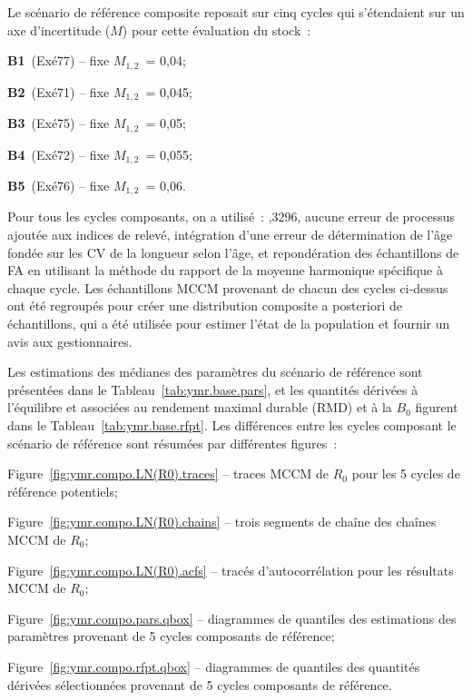 \documentclass[11pt]{book}
\begin{document}
Le sc\'{e}nario de r\'{e}f\'{e}rence composite reposait sur cinq cycles qui s'\'{e}tendaient sur un axe d'incertitude ($M$) pour cette \'{e}valuation du stock~:
\begin{itemize_csas}{}{}
\item \textbf{B1}~(Ex\'{e}77) -- fixe $M_{1,2}$~= 0,04;
\item \textbf{B2}~(Ex\'{e}71) -- fixe $M_{1,2}$~= 0,045;
\item \textbf{B3}~(Ex\'{e}75) -- fixe $M_{1,2}$~= 0,05;
\item \textbf{B4}~(Ex\'{e}72) -- fixe $M_{1,2}$~= 0,055;
\item \textbf{B5}~(Ex\'{e}76) -- fixe $M_{1,2}$~= 0,06.
\end{itemize_csas}

Pour tous les cycles composants, on a utilis\'{e}~: ,3296, aucune erreur de processus ajout\'{e}e aux indices de relev\'{e}, int\'{e}gration d'une erreur de d\'{e}termination de l'\^{a}ge fond\'{e}e sur les CV de la longueur selon l'\^{a}ge, et repond\'{e}ration des \'{e}chantillons de FA en utilisant la m\'{e}thode du rapport de la moyenne harmonique sp\'{e}cifique \`{a} chaque cycle.
Les \Nmcmc{} \'{e}chantillons MCCM provenant de chacun des cycles ci-dessus ont \'{e}t\'{e} regroup\'{e}s pour cr\'{e}er une distribution composite a posteriori de \Nbase{} \'{e}chantillons, qui a \'{e}t\'{e} utilis\'{e}e pour estimer l'\'{e}tat de la population et fournir un avis aux gestionnaires. 

Les estimations des m\'{e}dianes des param\`{e}tres du sc\'{e}nario de r\'{e}f\'{e}rence sont pr\'{e}sent\'{e}es dans le Tableau~\ref{tab:ymr.base.pars}, et les quantit\'{e}s d\'{e}riv\'{e}es \`{a} l'\'{e}quilibre et associ\'{e}es au rendement maximal durable (RMD) et \`{a} la $B_0$ figurent dans le Tableau~\ref{tab:ymr.base.rfpt}.
Les diff\'{e}rences entre les cycles composant le sc\'{e}nario de r\'{e}f\'{e}rence sont r\'{e}sum\'{e}es par diff\'{e}rentes figures~:
\begin{itemize_csas}{}{}
  \item Figure~\ref{fig:ymr.compo.LN(R0).traces} -- traces MCCM de $R_0$ pour les 5 cycles de r\'{e}f\'{e}rence potentiels;
  \item Figure~\ref{fig:ymr.compo.LN(R0).chains} -- trois segments de cha\^{i}ne des cha\^{i}nes MCCM de $R_0$;
  \item Figure~\ref{fig:ymr.compo.LN(R0).acfs}   -- trac\'{e}s d'autocorr\'{e}lation pour les r\'{e}sultats MCCM de $R_0$;
  \item Figure~\ref{fig:ymr.compo.pars.qbox} -- diagrammes de quantiles des estimations des param\`{e}tres provenant de 5 cycles composants de r\'{e}f\'{e}rence;
  \item Figure~\ref{fig:ymr.compo.rfpt.qbox} -- diagrammes de quantiles des quantit\'{e}s d\'{e}riv\'{e}es s\'{e}lectionn\'{e}es provenant de 5 cycles composants de r\'{e}f\'{e}rence.
\end{itemize_csas}
\end{document}

